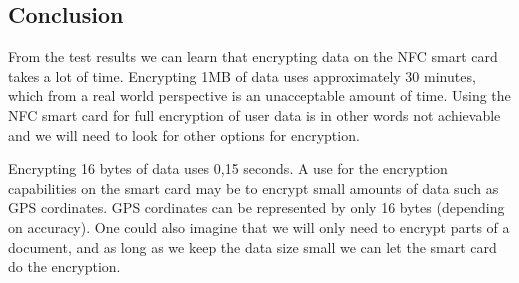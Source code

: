 \subsection{Conclusion}
From the test results we can learn that encrypting data on the NFC smart card takes a lot of time. Encrypting 1MB of data uses approximately 30 minutes, which from a real world perspective is an unacceptable amount of time. Using the NFC smart card for full encryption of user data is in other words not achievable and we will need to look for other options for encryption.

Encrypting 16 bytes of data uses 0,15 seconds. A use for the encryption capabilities on the smart card may be to encrypt small amounts of data such as GPS cordinates. GPS cordinates can be represented by only 16 bytes (depending on accuracy). One could also imagine that we will only need to encrypt parts of a document, and as long as we keep the data size small we can let the smart card do the encryption.
